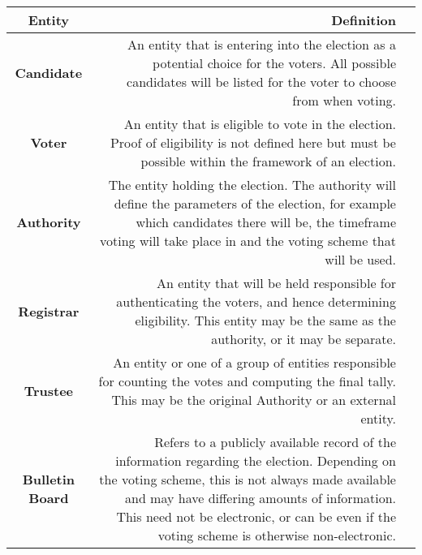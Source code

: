 \begin{table}[H]
    \centering
    \begin{tabular}{|Sr S{p{0.666\textwidth}}|}
        \hline
        \textbf{Entity}         & \textbf{Definition}                                                                                                                                                                                                                                                                             \\
        \hline\hline
        \textbf{Candidate}      & An entity that is entering into the election as a potential choice for the voters. All possible candidates will be listed for the voter to choose from when voting.                                                                                                                             \\
        \hline
        \textbf{Voter}          & An entity that is eligible to vote in the election. Proof of eligibility is not defined here but must be possible within the framework of an election.                                                                                                                                          \\
        \hline
        \textbf{Authority}      & The entity holding the election. The authority will define the parameters of the election, for example which candidates there will be, the timeframe voting will take place in and the voting scheme that will be used.                                                                         \\
        \hline
        \textbf{Registrar}      & An entity that will be held responsible for authenticating the voters, and hence determining eligibility. This entity may be the same as the authority, or it may be separate.                                                                                                                  \\
        \hline
        \textbf{Trustee}        & An entity or one of a group of entities responsible for counting the votes and computing the final tally. This may be the original Authority or an external entity.                                                                                                                             \\

        \hline
        \textbf{Bulletin Board} & Refers to a publicly available record of the information regarding the election. Depending on the voting scheme, this is not always made available and may have differing amounts of information. This need not be electronic, or can be even if the voting scheme is otherwise non-electronic. \\


\end{tabular}
\end{table}
